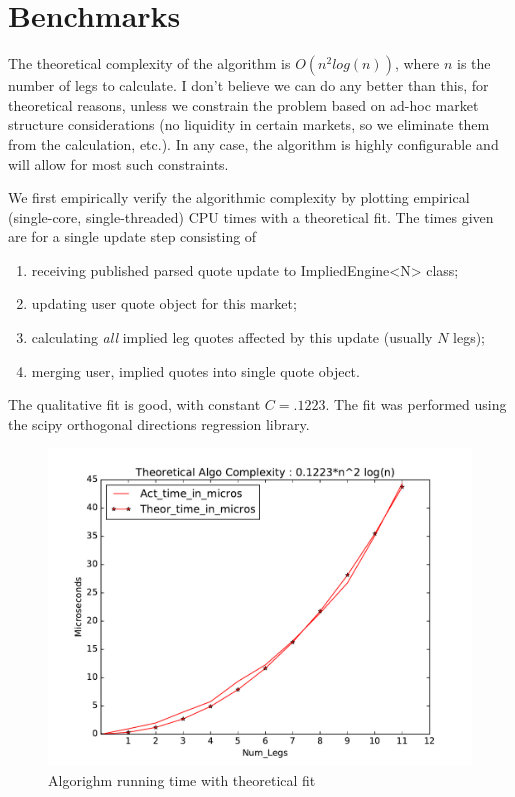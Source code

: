 \documentclass{article}
\begin{document}
\section*{Benchmarks}

The theoretical complexity of the algorithm is $O(n^2 log(n))$, where $n$ is the number of legs to calculate. I don't believe we can do any better than this, for theoretical reasons, unless we constrain the problem based on ad-hoc market structure considerations (no liquidity in certain markets, so we eliminate them from the calculation, etc.). In any case, the algorithm is highly configurable and will allow for most such constraints.

We first empirically verify the algorithmic complexity by plotting empirical (single-core, single-threaded) CPU times with a theoretical fit. The times given are for a single update step consisting of 

\begin{enumerate}
\item receiving published parsed quote update to ImpliedEngine<N> class;
\item updating user quote object for this market;
\item calculating {\it all} implied leg quotes affected by this update (usually $N$ legs);
\item merging user, implied quotes into single quote object.
\end{enumerate}

The qualitative fit is good, with constant $C=.1223$. The fit was performed using the scipy orthogonal directions regression library.

\clearpage
\begin{figure}
\includegraphics[scale=.55]{algo_complexity.pdf}
\caption{Algorighm running time with theoretical fit}
\end{figure}
\end{document}
